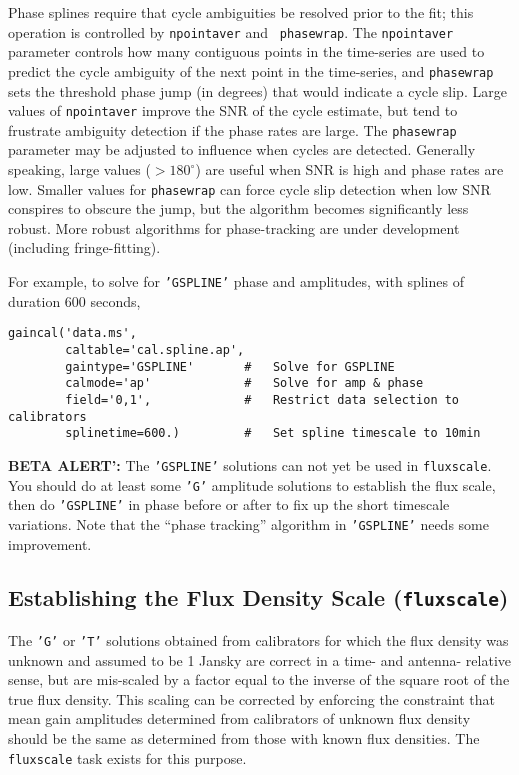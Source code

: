 Phase splines require that cycle ambiguities be resolved prior to the
fit; this operation is controlled by {\tt npointaver} and {\tt
phasewrap}.  The {\tt npointaver} parameter controls how many
contiguous points in the time-series are used to predict the cycle
ambiguity of the next point in the time-series, and {\tt phasewrap} sets
the threshold phase jump (in degrees) that would indicate a cycle
slip.  Large values of {\tt npointaver} improve the SNR of the cycle
estimate, but tend to frustrate ambiguity detection if the phase rates
are large.  The {\tt phasewrap} parameter may be adjusted to influence
when cycles are detected.  Generally speaking, large values
($>180^\circ$) are useful when SNR is high and phase rates are
low. Smaller values for {\tt phasewrap} can force cycle slip detection
when low SNR conspires to obscure the jump, but the algorithm becomes
significantly less robust.  More robust algorithms for phase-tracking
are under development (including fringe-fitting).

For example, to solve for {\tt 'GSPLINE'} phase and amplitudes, with
splines of duration 600 seconds, 
\small
\begin{verbatim}
gaincal('data.ms',
        caltable='cal.spline.ap',
        gaintype='GSPLINE'       #   Solve for GSPLINE
        calmode='ap'             #   Solve for amp & phase
        field='0,1',             #   Restrict data selection to calibrators
        splinetime=600.)         #   Set spline timescale to 10min
\end{verbatim}
\normalsize

{\bf BETA ALERT':} The {\tt 'GSPLINE'} solutions can not yet be
used in {\tt fluxscale}.  You should do at least some {\tt 'G'}
amplitude solutions to establish the flux scale, then do 
{\tt 'GSPLINE'} in phase before or after to fix up the short 
timescale variations.  Note that the ``phase tracking'' algorithm
in {\tt 'GSPLINE'} needs some improvement.

\subsection{Establishing the Flux Density Scale ({\tt fluxscale}) }
\label{section:cal.solve.fluxscale}

The {\tt 'G'} or {\tt 'T'} solutions obtained from calibrators for
which the flux 
density was unknown and assumed to be 1 Jansky are correct in a time- and
antenna- relative sense, but are mis-scaled by a factor equal to the
inverse of the square root of the true flux density.  This scaling can
be corrected by enforcing the constraint that mean gain amplitudes
determined from calibrators of unknown flux density should be the same
as determined from those with known flux densities.  The {\tt
fluxscale} task exists for this purpose.  

